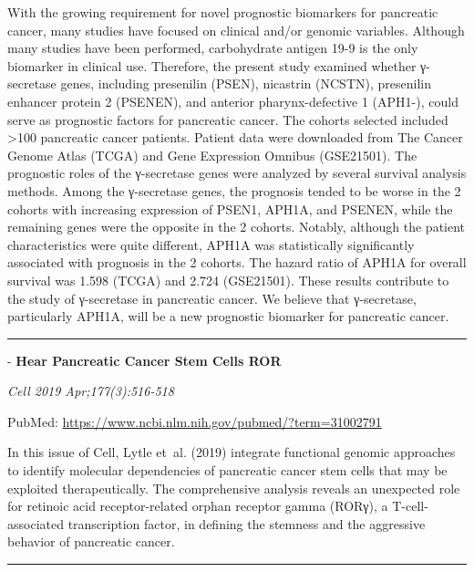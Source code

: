 \documentclass[]{article}
\begin{document}
With the growing requirement for novel prognostic biomarkers for
pancreatic cancer, many studies have focused on clinical and/or genomic
variables. Although many studies have been performed, carbohydrate
antigen 19-9 is the only biomarker in clinical use. Therefore, the
present study examined whether γ-secretase genes, including presenilin
(PSEN), nicastrin (NCSTN), presenilin enhancer protein 2 (PSENEN), and
anterior pharynx-defective 1 (APH1-), could serve as prognostic factors
for pancreatic cancer. The cohorts selected included \textgreater{}100
pancreatic cancer patients. Patient data were downloaded from The Cancer
Genome Atlas (TCGA) and Gene Expression Omnibus (GSE21501). The
prognostic roles of the γ-secretase genes were analyzed by several
survival analysis methods. Among the γ-secretase genes, the prognosis
tended to be worse in the 2 cohorts with increasing expression of PSEN1,
APH1A, and PSENEN, while the remaining genes were the opposite in the 2
cohorts. Notably, although the patient characteristics were quite
different, APH1A was statistically significantly associated with
prognosis in the 2 cohorts. The hazard ratio of APH1A for overall
survival was 1.598 (TCGA) and 2.724 (GSE21501). These results contribute
to the study of γ-secretase in pancreatic cancer. We believe that
γ-secretase, particularly APH1A, will be a new prognostic biomarker for
pancreatic cancer.

{}

{}

\begin{center}\rule{0.5\linewidth}{\linethickness}\end{center}

 - \textbf{Hear Pancreatic Cancer Stem Cells ROR}

\emph{Cell 2019 Apr;177(3):516-518}

PubMed: \url{https://www.ncbi.nlm.nih.gov/pubmed/?term=31002791}

In this issue of Cell, Lytle et~al. (2019) integrate functional genomic
approaches to identify molecular dependencies of pancreatic cancer stem
cells that may be exploited therapeutically. The comprehensive analysis
reveals an unexpected role for retinoic acid receptor-related orphan
receptor gamma (RORγ), a T-cell-associated transcription factor, in
defining the stemness and the aggressive behavior of pancreatic cancer.

{}

{}

\begin{center}\rule{0.5\linewidth}{\linethickness}\end{center}
\end{document}
